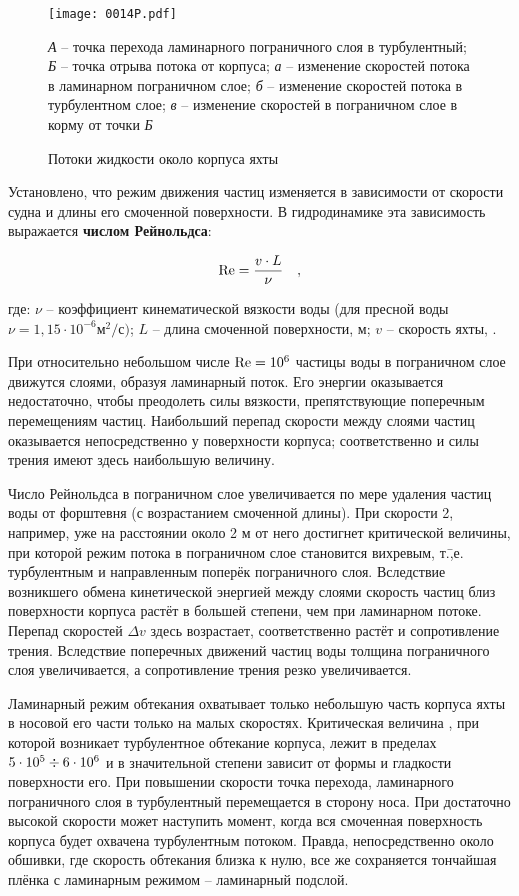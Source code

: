 \begin{figure*}[htb]
  \centering
  \texttt{[image: 0014P.pdf]}
  \caption{Потоки жидкости около корпуса яхты}
  \label{fig:14}
  \small
  \centering{}
  \textit{А} \--- точка перехода ламинарного пограничного слоя в турбулентный; \textit{Б} \--- точка отрыва потока от корпуса; \textit{а} \--- изменение скоростей потока в ламинарном пограничном слое; \textit{б} \--- изменение скоростей потока в турбулентном слое; \textit{в} \--- изменение скоростей в пограничном слое в корму от точки \textit{Б}
\end{figure*}

Установлено, что режим движения частиц изменяется в зависимости от
скорости судна и длины его смоченной поверхности. В гидродинамике эта
зависимость выражается \textbf{числом
Рейнольдса}:

\begin{equation}
  \mathrm {Re} = \frac{v \cdot L}{\nu} \quad , 
\end{equation}

где: $\nu$ \--- коэффициент кинематической вязкости воды (для пресной
воды $\nu = 1,15 \cdot 10^{-6} \text{м}^2/\text{с})$; $L$ \--- длина
смоченной поверхности, м; $v$ \--- скорость яхты, \speedms.

При относительно небольшом числе $\mathrm {Re} = 10^6$ частицы воды в
пограничном слое движутся слоями, образуя ламинарный поток. Его
энергии оказывается недостаточно, чтобы преодолеть силы вязкости,
препятствующие поперечным перемещениям частиц. Наибольший перепад
скорости между слоями частиц оказывается непосредственно у поверхности
корпуса; соответственно и силы трения имеют здесь наибольшую величину.

Число Рейнольдса в пограничном слое увеличивается по мере удаления
частиц воды от форштевня (с возрастанием смоченной длины). При
скорости 2\speedms, например, уже на расстоянии около 2 м от него
\Renum достигнет критической величины, при которой режим потока в
пограничном слое становится вихревым, т.\=,е. турбулентным и
направленным поперёк пограничного слоя. Вследствие возникшего обмена
кинетической энергией между слоями скорость частиц близ поверхности
корпуса растёт в большей степени, чем при ламинарном потоке. Перепад
скоростей $\Delta v$ здесь возрастает, соответственно растёт и
сопротивление трения. Вследствие поперечных движений частиц воды
толщина пограничного слоя увеличивается, а сопротивление трения резко
увеличивается.

Ламинарный режим обтекания охватывает только небольшую часть корпуса
яхты в носовой его части только на малых скоростях. Критическая
величина \Renum, при которой возникает турбулентное обтекание корпуса,
лежит в пределах $5 \cdot 10^5\div 6 \cdot 10^6$ и в значительной
степени зависит от формы и гладкости поверхности его. При повышении
скорости точка перехода, ламинарного пограничного слоя в турбулентный
перемещается в сторону носа. При достаточно высокой скорости может
наступить момент, когда вся смоченная поверхность корпуса будет
охвачена турбулентным потоком. Правда, непосредственно около обшивки,
где скорость обтекания близка к нулю, все же сохраняется тончайшая
плёнка с ламинарным режимом \--- ламинарный подслой.

